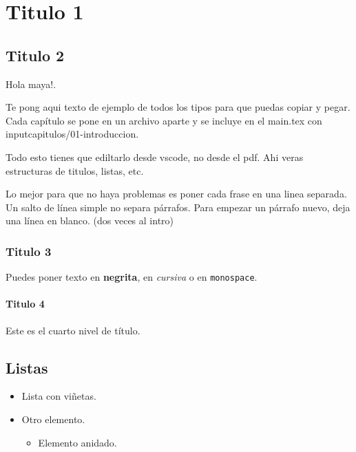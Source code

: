 
\chapter{Titulo 1}
\label{chap:ejemplo}

\section{Titulo 2}                        
Hola maya!.

Te pong aqui texto de ejemplo de todos los tipos para que puedas copiar y pegar.
Cada capítulo se pone en un archivo aparte y se incluye en el main.tex con input{capitulos/01-introduccion}.

Todo esto tienes que ediltarlo desde vscode, no desde el pdf.
Ahi veras estructuras de titulos, listas, etc.

Lo mejor para que no haya problemas es poner cada frase en una linea separada.
Un salto de línea simple no separa párrafos.
Para empezar un párrafo nuevo, deja una línea en blanco. (dos veces al intro)

\subsection{Titulo 3}                 
Puedes poner texto en \textbf{negrita}, en \textit{cursiva} o en \texttt{monospace}.

\subsubsection{Titulo 4}       
Este es el cuarto nivel de título.

\section{Listas}
\begin{itemize}
  \item Lista con viñetas.
  \item Otro elemento.
  \begin{itemize}
    \item Elemento anidado.
  \end{itemize}
\end{itemize}

